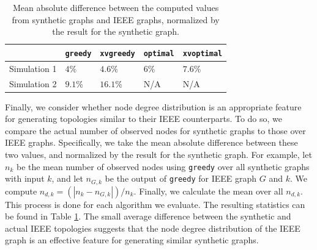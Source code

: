 \begin{table}
\begin{center}
\begin{tabular}{|l|l|l|l|l|}
\hline
 &  {\tt greedy} & {\tt xvgreedy}  & {\tt optimal} & {\tt xvoptimal}  \\
\hline \hline
Simulation 1  & $4\%$  & $4.6\%$ & $6\%$ & $7.6\%$  \\
\hline
Simulation 2 & $9.1\%$ & $16.1\%$ & N/A  & N/A  \\
\hline
\end{tabular}
\end{center}
\caption{Mean absolute difference between the computed values from synthetic graphs and IEEE graphs, normalized by the result for the synthetic graph.}
\label{tab:diff}
\end{table}

Finally, we consider whether node degree distribution is an appropriate feature for generating topologies similar to their IEEE counterparts.
To do so, we compare the actual number of observed nodes for synthetic graphs to those over IEEE graphs.  Specifically, we take the mean absolute difference between these two values,
and normalized by the result for the synthetic graph.
For example, let $n_{k}$ be the mean number of observed nodes using {\tt greedy} over all synthetic graphs with input $k$, and let $n_{G,k}$ 
be the output of {\tt greedy} for IEEE graph $G$ and $k$.
We compute $n_{d,k}=(|n_{k}-n_{G,k}|)/n_{k}$.  Finally, we calculate the mean over all $n_{d,k}$.
This process is done for each algorithm we evaluate.
The resulting statistics can be found in Table \ref{tab:diff}.  The small average difference between the synthetic and 
actual IEEE topologies suggests that the node degree distribution of the IEEE graph is an effective feature for generating similar synthetic graphs.
